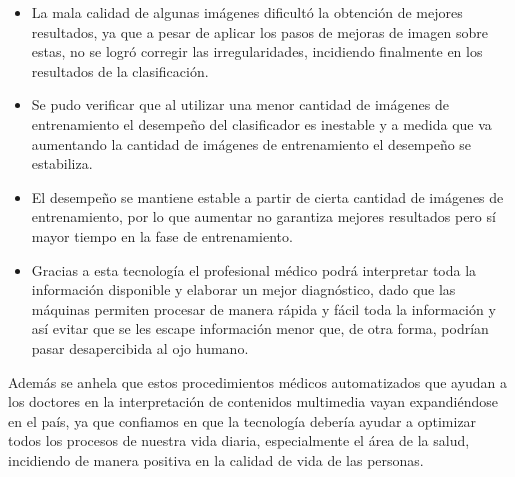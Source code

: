 \begin{itemize}
\item  La mala calidad de algunas imágenes dificultó la obtención de mejores resultados, ya que a pesar de aplicar los pasos de mejoras de imagen sobre estas, no se logró corregir las irregularidades, incidiendo finalmente en los resultados de la clasificación.


\item Se pudo verificar que al utilizar una menor cantidad de imágenes de entrenamiento el desempeño del clasificador es inestable y a medida que va aumentando la cantidad de imágenes de entrenamiento el desempeño se estabiliza.

\item El desempeño se mantiene estable a partir de cierta cantidad de imágenes de entrenamiento, por lo que aumentar no garantiza mejores resultados pero sí mayor tiempo en la fase de entrenamiento.

\item Gracias a esta tecnología el profesional médico podrá interpretar toda la información disponible y elaborar un mejor diagnóstico, dado que las máquinas permiten procesar de manera rápida y fácil toda la información y así evitar que se les escape información menor que, de otra forma, podrían pasar desapercibida al ojo humano.%

\end{itemize}
Además se anhela que estos procedimientos médicos automatizados que ayudan a los doctores en la interpretación de contenidos multimedia vayan expandiéndose en el país, ya que confiamos en que la tecnología debería ayudar a optimizar todos los procesos de nuestra vida diaria, especialmente el área de la salud, incidiendo de manera positiva en la calidad de vida de las personas.


